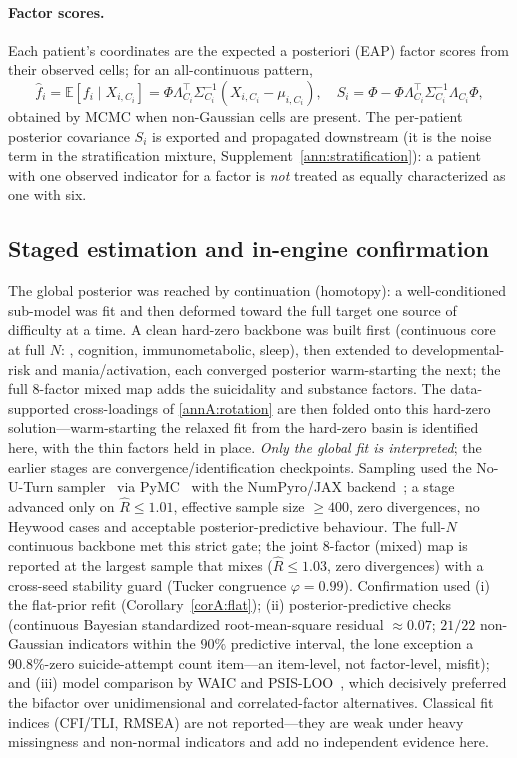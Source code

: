 \paragraph{Factor scores.} Each patient's coordinates are the expected a posteriori
(EAP) factor scores from their observed cells; for an all-continuous pattern,
\begin{equation}
  \hat f_i=\mathbb{E}[f_i\mid X_{i,C_i}]=\Phi\Lambda_{C_i}^{\top}\Sigma_{C_i}^{-1}\!\left(X_{i,C_i}-\mu_{i,C_i}\right),
  \quad
  S_i=\Phi-\Phi\Lambda_{C_i}^{\top}\Sigma_{C_i}^{-1}\Lambda_{C_i}\Phi ,
  \label{eqA:scores}
\end{equation}
obtained by MCMC when non-Gaussian cells are present. The per-patient posterior
covariance $S_i$ is exported and propagated downstream (it is the noise term in the
stratification mixture, Supplement~\ref{ann:stratification}): a patient with one observed
indicator for a factor is \emph{not} treated as equally characterized as one with six.

\subsection{Staged estimation and in-engine confirmation}
\label{annA:staged}

The global posterior was reached by continuation (homotopy): a well-conditioned
sub-model was fit and then deformed toward the full target one source of difficulty at
a time. A clean hard-zero backbone was built first (continuous core at full $N$:
\Gfac{}, cognition, immunometabolic, sleep), then extended to developmental-risk and
mania/activation, each converged posterior warm-starting the next; the full 8-factor
mixed map adds the suicidality and substance factors. The data-supported cross-loadings of
\ref{annA:rotation} are then folded onto this hard-zero solution---warm-starting the
relaxed fit from the hard-zero basin is identified here, with the thin factors held in
place. \emph{Only the global fit is interpreted}; the earlier stages are
convergence/identification checkpoints. Sampling used the No-U-Turn
sampler~\citep{hoffman2014nuts} via PyMC~\citep{abrilpla2023pymc} with the NumPyro/JAX
backend~\citep{phan2019numpyro}; a stage advanced only on $\hat R\le1.01$, effective
sample size $\ge400$, zero divergences, no Heywood cases and acceptable
posterior-predictive behaviour. The full-$N$ continuous backbone met this strict gate;
the joint 8-factor (mixed) map is reported at the largest sample that mixes
($\hat R\le1.03$, zero divergences) with a cross-seed stability guard (Tucker congruence
$\varphi=0.99$). Confirmation used (i) the flat-prior refit
(Corollary~\ref{corA:flat}); (ii) posterior-predictive checks (continuous Bayesian
standardized root-mean-square residual $\approx0.07$; $21/22$ non-Gaussian indicators
within the $90\%$ predictive interval, the lone exception a $90.8\%$-zero
suicide-attempt count item---an item-level, not factor-level, misfit); and (iii) model
comparison by WAIC and PSIS-LOO~\citep{watanabe2010waic,vehtari2017loo}, which
decisively preferred the bifactor over unidimensional and correlated-factor
alternatives. Classical fit indices (CFI/TLI, RMSEA) are not reported---they are weak
under heavy missingness and non-normal indicators and add no independent evidence here.
